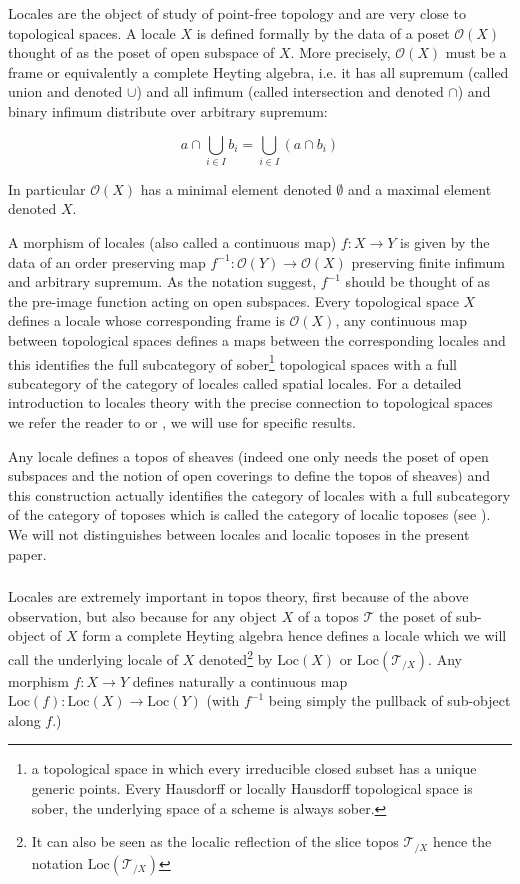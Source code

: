 \documentclass[a4paper]{article}
\newcommand{\loc}{\text{Loc}}
\newcommand{\Tcal}{\mathcal{T}}
\newcommand{\Ocal}{\mathcal{O}}
\newcommand{\block}[1]
{

\par \subsubsection{} #1

\bigskip}
\newcommand{\blockn}[1]{\par #1 \bigskip}
\begin{document}
\blockn{Locales are the object of study of point-free topology and are very close to topological spaces. A locale $X$ is defined formally by the data of a poset $\Ocal(X)$ thought of as the poset of open subspace of $X$. More precisely, $\Ocal(X)$ must be a frame or equivalently a complete Heyting algebra, i.e. it has all supremum (called union and denoted $\cup$) and all infimum (called intersection and denoted $\cap$) and binary infimum distribute over arbitrary supremum:

\[ a \cap \bigcup_{i \in I} b_i = \bigcup_{i \in I} \left( a \cap b_i \right) \]

In particular $\Ocal(X)$ has a minimal element denoted $\emptyset$ and a maximal element denoted $X$.

A morphism of locales (also called a continuous map) $f :X \rightarrow Y$ is given by the data of an order preserving map $f^{-1}: \Ocal(Y) \rightarrow \Ocal(X)$ preserving finite infimum and arbitrary supremum. As the notation suggest, $f^{-1}$ should be thought of as the pre-image function acting on open subspaces. Every topological space $X$ defines a locale whose corresponding frame is $\Ocal(X)$, any continuous map between topological spaces defines a maps between the corresponding locales and this identifies the full subcategory of sober\footnote{a topological space in which every irreducible closed subset has a unique generic points. Every Hausdorff or locally Hausdorff topological space is sober, the underlying space of a scheme is always sober.} topological spaces with a full subcategory of the category of locales called spatial locales. For a detailed introduction to locales theory with the precise connection to topological spaces we refer the reader to \cite{borceux3} or \cite{picado2012frames}, we will use \cite{sketches} for specific results.

Any locale defines a topos of sheaves (indeed one only needs the poset of open subspaces and the notion of open coverings to define the topos of sheaves) and this construction actually identifies the category of locales with a full subcategory of the category of toposes which is called the category of localic toposes (see \cite[A4.6]{sketches}). We will not distinguishes between locales and localic toposes in the present paper.

}

\block{Locales are extremely important in topos theory, first because of the above observation, but also because for any object $X$ of a topos $\Tcal$ the poset of sub-object of $X$ form a complete Heyting algebra hence defines a locale which we will call the underlying locale of $X$ denoted\footnote{It can also be seen as the localic reflection of the slice topos $\Tcal_{/X}$ hence the notation $\loc(\Tcal_{/X})$} by $\loc(X)$ or $\loc(\Tcal_{/X})$. Any morphism $f: X \rightarrow Y $ defines naturally a continuous map $\loc(f) : \loc(X) \rightarrow \loc(Y)$ (with $f^{-1}$ being simply the pullback of sub-object along $f$.) 
}
\end{document}
